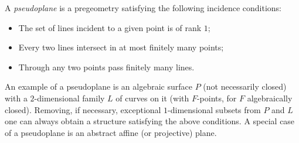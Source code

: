 A \emph{pseudoplane} is a pregeometry satisfying the following incidence conditions:
\begin{itemize}
\item The set of lines incident to a given point is of rank $1$;
\item Every two lines intersect in at most finitely many points;
\item Through any two points pass finitely many lines.
\end{itemize}

An example of a pseudoplane is an algebraic surface $P$ (not necessarily closed) with a $2$-dimensional family $L$ of curves on it (with $F$-points, for $F$ algebraically closed). Removing, if necessary, exceptional $1$-dimensional subsets from $P$ and $L$ one can always obtain a structure satisfying the above conditions. A special case of a pseudoplane is an abstract affine (or projective) plane.
